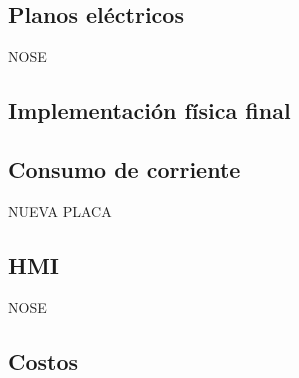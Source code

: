 \subsection{Planos eléctricos}
NOSE

\subsection{Implementación física final}
\subsection{Consumo de corriente}
NUEVA PLACA

\subsection{HMI}
NOSE

\subsection{Costos}